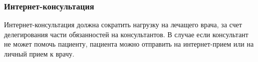 \subsubsection{Интернет-консультация}
Интернет-консультация должна сократить нагрузку на лечащего врача, за счет
делегирования части обязанностей на консультантов. В случае если консультант не
может помочь пациенту, пациента можно отправить на интернет-прием или на личный
прием к врачу.
